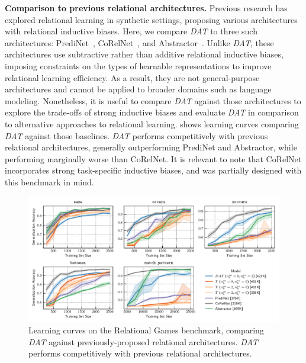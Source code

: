 \textbf{Comparison to previous relational architectures.} Previous research has explored relational learning in synthetic settings, proposing various architectures with relational inductive biases. Here, we compare \textit{DAT} to three such architectures: PrediNet~\citep{shanahanExplicitlyRelationalNeurala}, CoRelNet~\citep{kergNeuralArchitectureInductive2022}, and Abstractor~\citep{altabaa2024abstractors}. Unlike \textit{DAT}, these architectures use subtractive rather than additive relational inductive biases, imposing constraints on the types of learnable representations to improve relational learning efficiency. As a result, they are not general-purpose architectures and cannot be applied to broader domains such as language modeling. Nonetheless, it is useful to compare \textit{DAT} against those architectures to explore the trade-offs of strong inductive biases and evaluate \textit{DAT} in comparison to alternative approaches to relational learning.  shows learning curves comparing \textit{DAT} against those baselines. \textit{DAT} performs competitively with previous relational architectures, generally outperforming PrediNet and Abstractor, while performing marginally worse than CoRelNet. It is relevant to note that CoRelNet incorporates strong task-specific inductive biases, and was partially designed with this benchmark in mind.

\begin{figure}[h]
    \centering
    \includegraphics[width=\textwidth]{figs/experiments/relgames/relgames_learning_curves_baseline_comparisons.pdf}
    \caption{Learning curves on the Relational Games benchmark, comparing \textit{DAT} against previously-proposed relational architectures. \textit{DAT} performs competitively with previous relational architectures.}\label{fig:relgames_baselines}
\end{figure}

